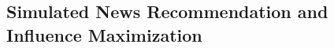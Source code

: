 \documentclass{article}
\begin{document}


\subsection{Simulated News Recommendation and Influence Maximization}
\end{document}
